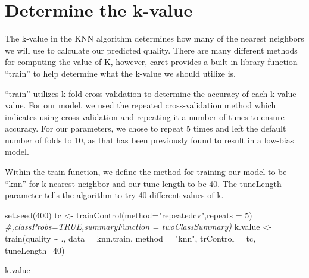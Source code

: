 \documentclass[
]{book}
\newenvironment{Shaded}{\begin{snugshade}}{\end{snugshade}}
\newcommand{\AttributeTok}[1]{\textcolor[rgb]{0.77,0.63,0.00}{#1}}
\newcommand{\CommentTok}[1]{\textcolor[rgb]{0.56,0.35,0.01}{\textit{#1}}}
\newcommand{\DecValTok}[1]{\textcolor[rgb]{0.00,0.00,0.81}{#1}}
\newcommand{\FunctionTok}[1]{\textcolor[rgb]{0.00,0.00,0.00}{#1}}
\newcommand{\NormalTok}[1]{#1}
\newcommand{\OtherTok}[1]{\textcolor[rgb]{0.56,0.35,0.01}{#1}}
\newcommand{\SpecialCharTok}[1]{\textcolor[rgb]{0.00,0.00,0.00}{#1}}
\newcommand{\StringTok}[1]{\textcolor[rgb]{0.31,0.60,0.02}{#1}}
\begin{document}
\hypertarget{determine-the-k-value}{%
\section{Determine the k-value}\label{determine-the-k-value}}

The k-value in the KNN algorithm determines how many of the nearest neighbors we will use to calculate our predicted quality. There are many different methods for computing the value of K, however, caret provides a built in library function ``train'' to help determine what the k-value we should utilize is.

``train'' utilizes k-fold cross validation to determine the accuracy of each k-value value. For our model, we used the repeated cross-validation method which indicates using cross-validation and repeating it a number of times to ensure accuracy. For our parameters, we chose to repeat 5 times and left the default number of folds to 10, as that has been previously found to result in a low-bias model.

Within the train function, we define the method for training our model to be ``knn'' for k-nearest neighbor and our tune length to be 40. The tuneLength parameter tells the algorithm to try 40 different values of k.

\begin{Shaded}
\begin{Highlighting}[]
\FunctionTok{set.seed}\NormalTok{(}\DecValTok{400}\NormalTok{)}
\NormalTok{tc }\OtherTok{\textless{}{-}} \FunctionTok{trainControl}\NormalTok{(}\AttributeTok{method=}\StringTok{"repeatedcv"}\NormalTok{,}\AttributeTok{repeats =} \DecValTok{5}\NormalTok{) }\CommentTok{\#,classProbs=TRUE,summaryFunction = twoClassSummary)}
\NormalTok{k.value }\OtherTok{\textless{}{-}} \FunctionTok{train}\NormalTok{(quality }\SpecialCharTok{\textasciitilde{}}\NormalTok{ ., }\AttributeTok{data =}\NormalTok{ knn.train, }\AttributeTok{method =} \StringTok{"knn"}\NormalTok{, }\AttributeTok{trControl =}\NormalTok{ tc, }\AttributeTok{tuneLength=}\DecValTok{40}\NormalTok{)}

\NormalTok{k.value}
\end{Highlighting}
\end{Shaded}
\end{document}
